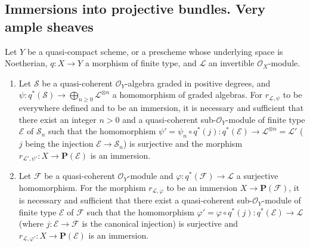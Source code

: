 \subsection{Immersions into projective bundles. Very ample sheaves}
\label{subsection:II.4.4}

\begin{proposition}[4.4.1]
\label{II.4.4.1}
Let $Y$ be a quasi-compact scheme, or a prescheme whose underlying space
is Noetherian, $q:X\to Y$ a morphism \textup{of finite type}, and $\mathcal{L}$ an
invertible $\mathcal{O}_X$-module.
\begin{enumerate}
  \item[\rm{(i)}] Let $\mathcal{S}$ be a quasi-coherent $\mathcal{O}_Y$-algebra
  graded in positive degrees, and
  $\psi:q^*(\mathcal{S})\to\bigoplus_{n\geq0}\mathcal{L}^{\otimes n}$ a
  homomorphism of graded algebras. For $r_{\mathcal{L},\psi}$ to be
  everywhere defined and to be an immersion, it is necessary and
  sufficient that there exist an integer $n>0$ and a quasi-coherent
  sub-$\mathcal{O}_Y$-module \textup{of finite type} $\mathcal{E}$ of $\mathcal{S}_n$
  such that the homomorphism $\psi'=\psi_n\circ q^*(j):q^*(\mathcal{E})
  \to\mathcal{L}^{\otimes n}=\mathcal{L}'$
  ($j$ being the injection $\mathcal{E}\to\mathcal{S}_n$) is surjective and
  the morphism
  $r_{\mathcal{L}',\psi'}:X\to\mathbf{P}(\mathcal{E})$ is an immersion.
  \item[\rm{(ii)}] Let $\mathcal{F}$ be a quasi-coherent
  $\mathcal{O}_Y$-module and $\varphi:q^*(\mathcal{F})\to\mathcal{L}$ a
  surjective homomorphism. For the morphism $r_{\mathcal{L},\varphi}$ to be an
  immersion $X\to\mathbf{P}(\mathcal{F})$, it is necessary and sufficient that
  there exist a quasi-coherent sub-$\mathcal{O}_Y$-module \textup{of finite type}
  $\mathcal{E}$ of $\mathcal{F}$ such that the homomorphism
  $\varphi'=\varphi\circ q^*(j):q^*(\mathcal{E})\to\mathcal{L}$ (where
  $j:\mathcal{E}\to\mathcal{F}$ is the canonical injection) is surjective and
  $r_{\mathcal{L},\varphi'}:X\to\mathbf{P}(\mathcal{E})$ is an
  immersion.
\end{enumerate}
\end{proposition}

